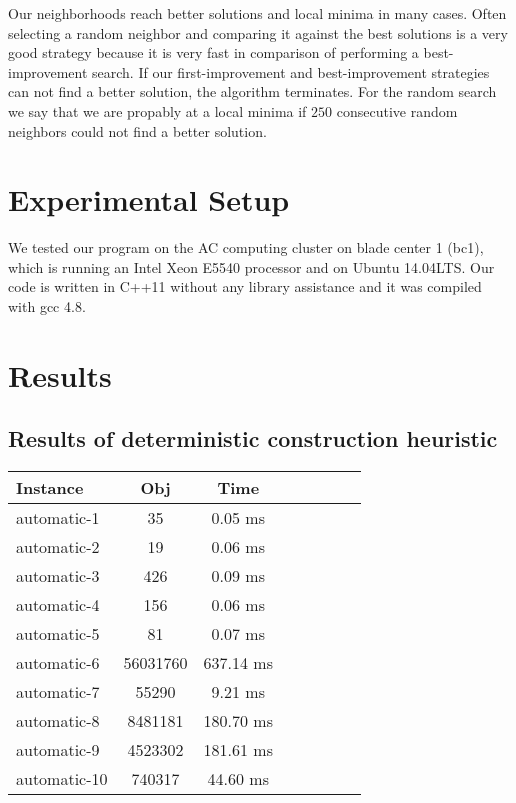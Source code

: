 \documentclass[11pt]{article}
\begin{document}
Our neighborhoods reach better solutions and local minima in many cases.
Often selecting a random neighbor and comparing it against the best solutions is a very good strategy because it is very fast in comparison of performing a best-improvement search.
If our first-improvement and best-improvement strategies can not find a better solution, the algorithm terminates.
For the random search we say that we are propably at a local minima if $250$ consecutive random neighbors could not find a better solution.

\section{Experimental Setup}
We tested our program on the AC computing cluster on blade center 1 (bc1), which is running an Intel Xeon E5540 processor and on Ubuntu 14.04LTS.
Our code is written in C++11 without any library assistance and it was compiled with gcc 4.8.

\newpage
\section{Results}
\subsection{Results of deterministic construction heuristic}
{
\center
\begin{tabular}{l*{6}{c}r}
Instance & Obj & Time \\
\hline
automatic-1 & 35 & 0.05 ms \\
automatic-2 & 19 & 0.06 ms \\
automatic-3 & 426 & 0.09 ms \\
automatic-4 & 156 & 0.06 ms \\
automatic-5 & 81 & 0.07 ms \\
automatic-6 & 56031760 & 637.14 ms \\
automatic-7 & 55290 & 9.21 ms \\
automatic-8 & 8481181 & 180.70 ms \\
automatic-9 & 4523302 & 181.61 ms \\
automatic-10 & 740317 & 44.60 ms \\
\end{tabular}
}
\end{document}
